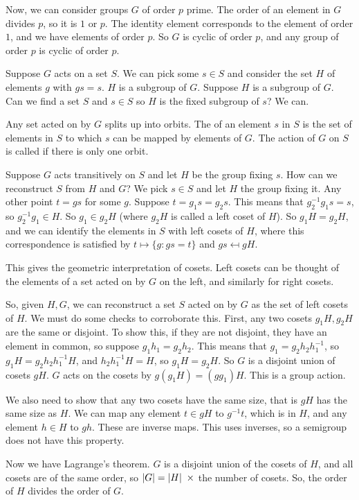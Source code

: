 \documentclass[11pt, oneside]{amsart}
\begin{document}
Now, we can consider groups $G$ of order $p$ prime. The order of an element in $G$ divides $p$, so it is $1$ or $p$. The identity element corresponds to the element of order $1$, and we have elements of order $p$. So $G$ is cyclic of order $p$, and any group of order $p$ is cyclic of order $p$.

Suppose $G$ acts on a set $S$. We can pick some $s\in S$ and consider the set $H$ of elements $g$ with $gs=s$. $H$ is a subgroup of $G$. Suppose $H$ is a subgroup of $G$. Can we find a set $S$ and $s\in S$ so $H$ is the fixed subgroup of $s$? We can.

Any set acted on by $G$ splits up into orbits. The  of an element $s$ in $S$ is the set of elements in $S$ to which $s$ can be mapped by elements of $G$. The action of $G$ on $S$ is called  if there is only one orbit.

Suppose $G$ acts transitively on $S$ and let $H$ be the group fixing $s$. How can we reconstruct $S$ from $H$ and $G$? We pick $s\in S$ and let $H$ the group fixing it. Any other point $t=gs$ for some $g$. Suppose $t=g_1s=g_2s$. This means that $g_2^{-1}g_1s=s$, so $g_2^{-1}g_1 \in H$. So $g_1 \in g_2 H$ (where $g_2H$ is called a left coset of $H$). So $g_1H=g_2H$, and we can identify the elements in $S$ with left cosets of $H$, where this correspondence is satisfied by $t\mapsto \{ g : gs = t\} $ and $gs \mapsfrom gH$.  

This gives the geometric interpretation of cosets. Left cosets can be thought of the elements of a set acted on by $G$ on the left, and similarly for right cosets.

So, given $H,G$, we can reconstruct a set $S$ acted on by $G$ as the set of left cosets of $H$. We must do some checks to corroborate this. First, any two cosets $g_1H, g_2H$ are the same or disjoint. To show this, if they are not disjoint, they have an element in common, so suppose $g_1h_1 = g_2h_2$. This means that $g_1 = g_2h_2h_1^{-1}$, so $g_1 H = g_2 h_2h_1^{-1} H$, and $h_2h_1^{-1}H = H$, so $g_1H = g_2H$. So $G$ is a disjoint union of cosets $gH$. $G$ acts on the cosets by $g(g_1H) = (gg_1)H$. This is a group action. 

We also need to show that any two cosets have the same size, that is $gH$ has the same size as $H$. We can map any element $t\in gH $ to $g^{-1}t$, which is in $H$, and any element $h\in H$ to $gh$. These are inverse maps. This uses inverses, so a {semigroup} does not have this property. 

Now we have Lagrange's theorem. $G$ is a disjoint union of the cosets of $H$, and all cosets are of the same order, so $\left \lvert G \right \rvert = \left \lvert H \right \rvert \ \times$ the number of cosets. So, the order of $H$ divides the order of $G$.
\end{document}
